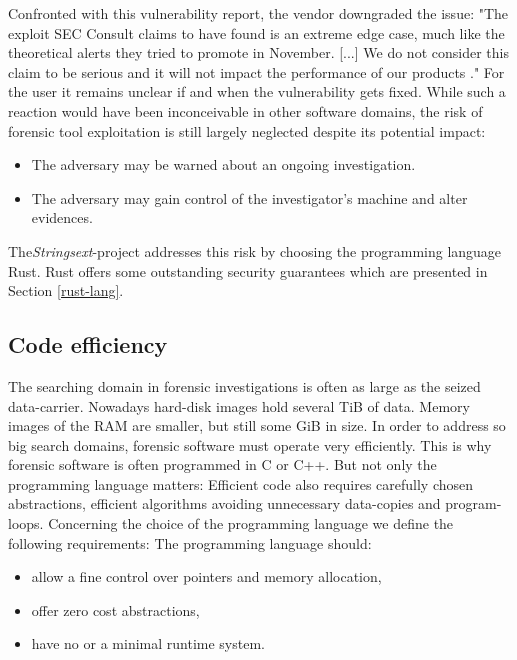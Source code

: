 \documentclass[final,5p,times,twocolumn]{elsarticle}
\begin{document}
Confronted with this vulnerability report, the vendor downgraded the issue: "The
exploit SEC Consult claims to have found is an extreme edge case, much like the
theoretical alerts they tried to promote in November. [...] We do not consider
this claim to be serious and it will not impact the performance of our products
\cite{secconsult2017}." For the user it remains unclear if and when the
vulnerability gets fixed. While such a reaction would have been inconceivable in
other software domains, the risk of forensic tool exploitation is still largely
neglected despite its potential impact:

\begin{itemize} 

    \item The adversary may be warned about an ongoing investigation.

    \item The adversary may gain control of the investigator's machine
        and alter evidences.

\end{itemize}

The\emph{Stringsext}-project addresses this risk by choosing the programming
language Rust. Rust offers some outstanding security guarantees which are
presented in Section \ref{rust-lang}.


\subsection{Code efficiency}
\label{subsec:code-efficiency}

The searching domain in forensic investigations is often as large as the seized
data-carrier. Nowadays hard-disk images hold several TiB of data.  Memory images
of the RAM are smaller, but still some GiB in size. In order to address so big
search domains, forensic software must operate very efficiently. This is why
forensic software is often programmed in C or C++. But not only the programming
language matters: Efficient code also requires carefully chosen abstractions,
efficient algorithms avoiding unnecessary data-copies and program-loops.
Concerning the choice of the programming language we define the following
requirements: The programming language should:

\begin{itemize}
\item
  allow a fine control over pointers and memory allocation,
\item
  offer zero cost abstractions,
\item
  have no or a minimal runtime system.
\end{itemize}
\end{document}
